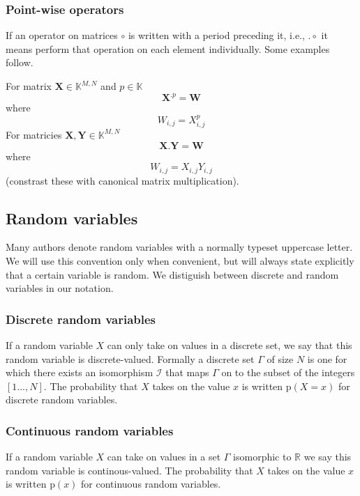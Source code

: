 \subsubsection{Point-wise operators}

If an operator on matrices $\circ$ is written with a period preceding it, i.e.,
$.\circ$ it
means perform that operation on each element individually. Some examples follow.

For matrix $\boldsymbol{X} \in \mathbb{K}^{M,N}$ and $p \in \mathbb{K}$
\[
    \boldsymbol{X}^{.p} = \boldsymbol{W}
\] where
\[
    W_{i,j}=X_{i,j}^{p}
\]
For matricies $\boldsymbol{X},\boldsymbol{Y} \in \mathbb{K}^{M,N}$
\[
    \boldsymbol{X}.\boldsymbol{Y} = \boldsymbol{W}
\] where
\[
    W_{i,j}=X_{i,j}Y_{i,j}
\]
(constrast these with canonical matrix multiplication).

\subsection{Random variables}

Many authors denote random variables with a normally typeset uppercase letter.
We will use this convention only when convenient, but will always state
explicitly that a certain variable is random. We distiguish between discrete and
random variables in our notation.

\subsubsection{Discrete random variables}

If a random variable $X$ can only take on values in a discrete set, we say that this
random variable is discrete-valued. Formally a discrete set $\Gamma$ of size $N$
is one for which there exists an isomorphism $\mathscr{I}$ that maps $\Gamma$ on
to the subset of the integers $[1 \dotsc, N]$. The probability that $X$ takes on
the value $x$ is written $\mathrm{p}(X=x)$ for discrete random variables.

\subsubsection{Continuous random variables}

If a random variable $X$ can take on values in a set $\Gamma$ isomorphic to
$\mathbb{R}$ we say this random variable is continous-valued. The probability
that $X$ takes on the value $x$ is written $\mathrm{p}(x)$ for continuous random
variables.

